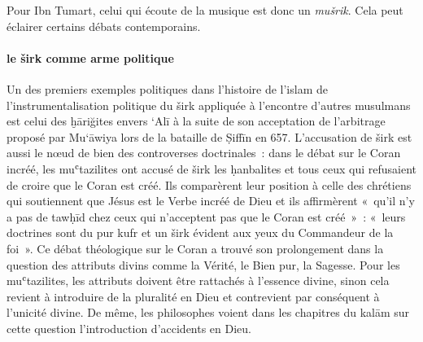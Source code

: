 Pour Ibn Tumart, celui qui écoute de la musique est donc un
\emph{mušrik}. Cela peut éclairer certains débats contemporains.

\paragraph{le širk comme arme politique}

Un des premiers exemples politiques dans l'histoire de l'islam de
l'instrumentalisation politique du širk appliquée à l'encontre d'autres
musulmans est celui des ḫāriğites envers `Alī à la suite de son
acceptation de l'arbitrage proposé par Mu`āwiya lors de la bataille de
Ṣiffīn en 657.
L'accusation de širk est aussi le nœud de bien des controverses
doctrinales~: dans le débat sur le Coran incréé, les muʿtazilites ont
accusé de širk les ḥanbalites et tous ceux qui refusaient de croire que
le Coran est créé. Ils comparèrent leur position à celle des chrétiens
qui soutiennent que Jésus est le Verbe incréé de Dieu et ils affirmèrent
«~qu'il n'y a pas de tawḥīd chez ceux qui n'acceptent pas que le Coran
est créé~»~: «~leurs doctrines sont du pur kufr et un širk évident aux
yeux du Commandeur de la foi~». Ce débat
théologique sur le Coran a trouvé son prolongement dans la question des
attributs divins comme la Vérité, le Bien pur, la Sagesse. Pour les
muʿtazilites, les attributs doivent être rattachés à l'essence divine,
sinon cela revient à introduire de la pluralité en Dieu et contrevient
par conséquent à l'unicité divine. De même, les philosophes voient dans
les chapitres du kalām sur cette question l'introduction d'accidents en
Dieu.

